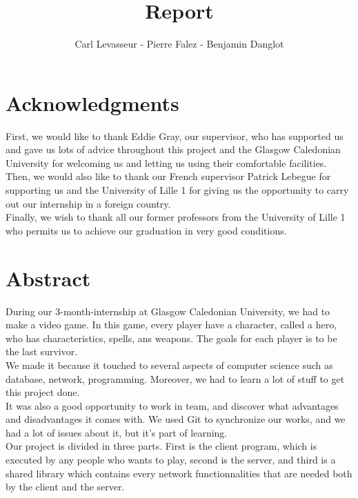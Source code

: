 \documentclass{scrreprt}
\author{Carl Levasseur - Pierre Falez - Benjamin Danglot}
\title{Report}
\begin{document}
\maketitle{}

\chapter*{Acknowledgments} %
First, we would like to thank Eddie Gray, our supervisor, who has supported us and
gave us lots of advice throughout this project and the Glasgow Caledonian University for
welcoming us and letting us using their comfortable facilities.\\

Then, we would also like to thank our French supervisor Patrick Lebegue for supporting us
and the University of Lille 1 for giving us the opportunity to carry out our internship in a
foreign country.\\

Finally, we wish to thank all our former professors from the University of Lille 1 who
permits us to achieve our graduation in very good conditions.\\

\chapter*{Abstract}
During our 3-month-internship at Glasgow Caledonian University, we had to make a video game.
In this game, every player have a character, called a hero, who has characteristics, spells, ans weapons.
The goals for each player is to be the last survivor.\\

We made it because it touched to several aspects of computer science such as database, network,
programming. Moreover, we had to learn a lot of stuff to get this project done.\\
It was also a good opportunity to work in team, and discover what advantages and disadvantages it comes with.
We used Git to synchronize our works, and we had a lot of issues about it, but it's part of learning.\\

Our project is divided in three parts. First is the client program, which is executed by any people who wants to play,
second is the server, and third is a shared library which contains every network functionnalities that are needed both
by the client and the server.\\
\end{document}
